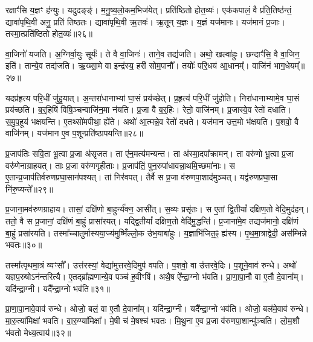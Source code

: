 रक्षाꣳ॑सि य॒ज्ञꣳ ह॑न्युः।
यदुदङ्ङ्॑।
म॒नु॒ष्य॒लो॒कम॒भिज॑येत्।
प्रति॑\-ष्ठितो होत॒व्यः॑।
एक॑कपालं॒ वै प्र॑ति॒तिष्ठ॑न्तं॒ द्यावा॑पृथि॒वी अनु॒ प्रति॑ तिष्ठतः।
द्यावा॑पृथि॒वी ऋ॒तवः॑।
ऋ॒तून् य॒ज्ञः।
य॒ज्ञं यज॑मानः।
यज॑मानं प्र॒जाः।
तस्मा॒त्प्रति॑\-ष्ठितो होत॒व्यः॑॥२६॥

वा॒जिनो॑ यजति।
अ॒ग्निर्वा॒युः सूर्यः॑।
ते वै वा॒जिनः॑।
ताने॒व तद्य॑जति।
अथो॒ खल्वा॑हुः।
छन्दाꣳ॑सि॒ वै वा॒जिन॒ इति॑।
तान्ये॒व तद्य॑जति।
ऋ॒ख्सा॒मे वा इन्द्र॑स्य॒ हरी॑ सोम॒पानौ᳚।
तयोः᳚ परि॒धय॑ आ॒धानम्᳚।
वाजि॑नं भाग॒धेयम्᳚॥२७॥

यदप्र॑हृत्य परि॒धीं जु॑हु॒यात्।
अ॒न्तरा॑धानाभ्यां घा॒सं प्रय॑च्छेत्।
प्र॒हृत्य॑ परि॒धीं जु॑होति।
निरा॑धानाभ्यामे॒व घा॒सं प्रय॑च्छति।
ब॒र्॒हिषि॑ विषि॒ञ्चन्वाजि॑न॒मा न॑यति।
प्र॒जा वै ब॒र्॒हिः।
रेतो॒ वाजि॑नम्।
प्र॒जास्वे॒व रेतो॑ दधाति।
स॒मु॒प॒हूय॑ भक्षयन्ति।
ए॒तथ्सो॑मपीथा॒ ह्ये॑ते।
अथो॑ आ॒त्मन्ने॒व रेतो॑ दधते।
यज॑मान उत्त॒मो भ॑क्षयति।
प॒शवो॒ वै वाजि॑नम्।
यज॑मान ए॒व प॒शून्प्रति॑\-ष्ठापयन्ति॥२८॥\anuvakamend[लो॒को ब॑हुरू॒पं भ॑व॒त्याज्य॑भागौ प॒शव॒ आज्य॑मव॒द्येदा॑हव॒नीयः॑ प्र॒त्यक्तस्मा॒त्प्रति॑\-ष्ठितो होत॒व्यो॑ भाग॒धेय॑मे॒ते च॒त्वारि॑ च]

प्र॒जा\-प॑तिः सवि॒ता भू॒त्वा प्र॒जा अ॑\-सृजत।
ता ए॑न॒मत्य॑मन्यन्त।
ता अ॑स्मा॒दपा᳚क्रामन्।
ता वरु॑णो भू॒त्वा प्र॒जा वरु॑णेनाग्राहयत्।
ताः प्र॒जा वरु॑णगृहीताः।
प्र॒जा\-प॑तिं॒ पुन॒रुपा॑धावन्ना॒थमि॒च्छमा॑नाः।
स ए॒तान्प्र॒जा\-प॑तिर्वरुण\-प्रघा॒सान॑पश्यत्।
तां निर॑वपत्।
तैर्वै स प्र॒जा व॑रुणपा॒शाद॑मुञ्चत्।
यद्व॑रुणप्रघा॒सा नि॑रु॒प्यन्ते᳚॥२९॥

प्र॒जाना॒मव॑रुणग्राहाय।
तासां॒ दक्षि॑णो बा॒हुर्न्य॑क्न॒ आसी᳚त्।
स॒व्यः प्रसृ॑तः।
स ए॒तां द्वि॒तीयां᳚ दक्षिण॒तो वेदि॒मुद॑हन्।
ततो॒ वै स प्र॒जानां॒ दक्षि॑णं बा॒हुं प्रासा॑रयत्।
यद्द्वि॒तीयां᳚ दक्षिण॒तो वेदि॑मु॒द्धन्ति॑।
प्र॒जाना॑मे॒व तद्यज॑मानो॒ दक्षि॑णं बा॒हुं प्रसा॑रयति।
तस्मा᳚च्चातुर्मास्यया॒ज्य॑मुष्मिँ॑ल्लो॒क उ॑भ॒याबा॑हुः।
य॒ज्ञाभि॑जित॒ꣴ॒ ह्य॑स्य।
पृ॒थ॒मा॒त्राद्वेदी॒ अस॑म्भिन्ने भवतः॥३०॥

तस्मा᳚त्पृथमा॒त्रं व्यꣳसौ᳚।
उत्त॑रस्यां॒ वेद्या॑मुत्तरवे॒दिमुप॑ वपति।
प॒शवो॒ वा उ॑त्तरवे॒दिः।
प॒शूने॒वाव॑ रुन्धे।
अथो॑ यज्ञप॒रुषो\-ऽन॑न्तरित्यै।
ए॒तद्ब्रा᳚ह्मणान्ये॒व पञ्च॑ ह॒वीꣳषि॑।
अथै॒ष ऐ᳚न्द्रा॒ग्नो भ॑वति।
प्रा॒णा॒पा॒नौ वा ए॒तौ दे॒वाना᳚म्।
यदि॑न्द्रा॒ग्नी।
यदै᳚न्द्रा॒ग्नो भव॑ति॥३१॥

प्रा॒णा॒पा॒नावे॒वाव॑ रुन्धे।
ओजो॒ बलं॒ वा ए॒तौ दे॒वाना᳚म्।
यदि॑न्द्रा॒ग्नी।
यदै᳚न्द्रा॒ग्नो भव॑ति।
ओजो॒ बल॑मे॒वाव॑ रुन्धे।
मा॒रु॒त्या॑\-मिक्षा॑ भवति।
वा॒रु॒ण्या॑मिक्षा᳚।
मे॒षी च॑ मे॒षश्च॑ भवतः।
मि॒थु॒ना ए॒व प्र॒जा व॑रुणपा॒शान्मु॑ञ्चति।
लो॒म॒शौ भ॑वतो मेध्य॒त्वाय॑॥३२॥

